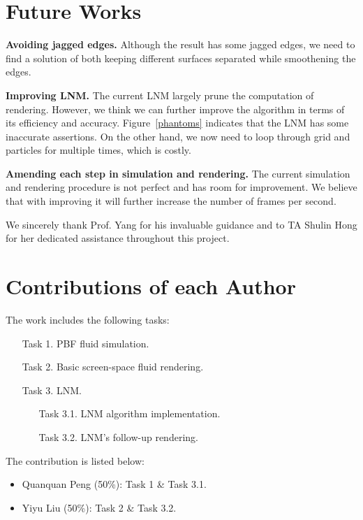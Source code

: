 \documentclass[sigconf]{acmart}
\begin{document}
\section{Future Works}

\textbf{Avoiding jagged edges.} Although the result has some jagged edges, we need to find a solution of both keeping different surfaces separated while smoothening the edges.

\textbf{Improving LNM.} The current LNM largely prune the computation of rendering. However, we think we can further improve the algorithm in terms of its efficiency and accuracy. Figure~\ref{phantoms} indicates that the LNM has some inaccurate assertions. On the other hand, we now need to loop through grid and particles for multiple times, which is costly.

\textbf{Amending each step in simulation and rendering.} The current simulation and rendering procedure is not perfect and has room for improvement. We believe that with improving it will further increase the number of frames per second.


\begin{acks}
We sincerely thank Prof. Yang for his invaluable guidance and to TA Shulin Hong for her dedicated assistance throughout this project.
\end{acks}





\appendix

\section{Contributions of each Author}
The work includes the following tasks:
\begin{enumerate}
  \item [Task 1.] PBF fluid simulation.
  \item [Task 2.] Basic screen-space fluid rendering.
  \item [Task 3.] LNM.
  \begin{enumerate}
    \item [Task 3.1.] LNM algorithm implementation.
    \item [Task 3.2.] LNM's follow-up rendering.
  \end{enumerate}
\end{enumerate}

The contribution is listed below:
\begin{itemize}
  \item Quanquan Peng (50\%): Task 1 \& Task 3.1.
  \item Yiyu Liu (50\%): Task 2 \& Task 3.2.
\end{itemize}
\end{document}
